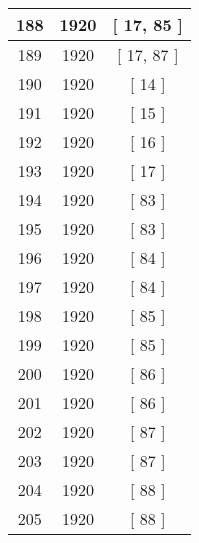 \begin{center}
\begin{longtable}[H]{|| c c c ||}
188 & 1920 & [ 17, 85 ]
\\\hline
189 & 1920 & [ 17, 87 ]
\\\hline
190 & 1920 & [ 14 ]
\\\hline
191 & 1920 & [ 15 ]
\\\hline
192 & 1920 & [ 16 ]
\\\hline
193 & 1920 & [ 17 ]
\\\hline
194 & 1920 & [ 83 ]
\\\hline
195 & 1920 & [ 83 ]
\\\hline
196 & 1920 & [ 84 ]
\\\hline
197 & 1920 & [ 84 ]
\\\hline
198 & 1920 & [ 85 ]
\\\hline
199 & 1920 & [ 85 ]
\\\hline
200 & 1920 & [ 86 ]
\\\hline
201 & 1920 & [ 86 ]
\\\hline
202 & 1920 & [ 87 ]
\\\hline
203 & 1920 & [ 87 ]
\\\hline
204 & 1920 & [ 88 ]
\\\hline
205 & 1920 & [ 88 ]
\\\hline
\end{longtable}
\end{center}
